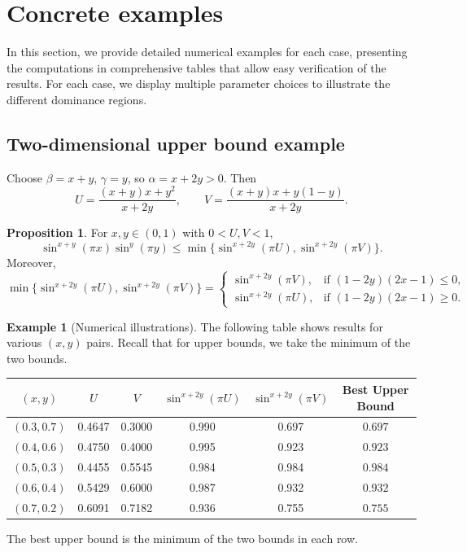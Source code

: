 \documentclass[12pt]{amsart}
\theoremstyle{definition}
\newtheorem{proposition}{Proposition}[section]
\newtheorem{example}{Example}[section]
\begin{document}

\section{Concrete examples}
\label{sec:examples}

In this section, we provide detailed numerical examples for each case, presenting the computations in comprehensive tables that allow easy verification of the results. For each case, we display multiple parameter choices to illustrate the different dominance regions.

\subsection{Two-dimensional upper bound example}

Choose $\beta = x + y$, $\gamma = y$, so $\alpha = x + 2y > 0$. Then
\[
U = \frac{(x+y)x + y^2}{x+2y}, \qquad V = \frac{(x+y)x + y(1-y)}{x+2y}.
\]

\begin{proposition}\label{prop:2d-upper-concrete}
For $x,y \in (0,1)$ with $0 < U,V < 1$,
\[
\sin^{x+y}(\pi x) \sin^y(\pi y) \leq \min\{\sin^{x+2y}(\pi U), \sin^{x+2y}(\pi V)\}.
\]
Moreover,
\[
\min\{\sin^{x+2y}(\pi U), \sin^{x+2y}(\pi V)\}
=
\begin{cases}
\sin^{x+2y}(\pi V), & \text{if } (1-2y)(2x-1) \leq 0,\\
\sin^{x+2y}(\pi U), & \text{if } (1-2y)(2x-1) \geq 0.
\end{cases}
\]
\end{proposition}

\begin{example}[Numerical illustrations]
The following table shows results for various $(x,y)$ pairs. Recall that for upper bounds, we take the minimum of the two bounds.

\begin{table}[h]
\centering
\begin{tabular}{|c|c|c|c|c|c|}
\hline
$(x,y)$ & $U$ & $V$ & $\sin^{x+2y}(\pi U)$ & $\sin^{x+2y}(\pi V)$ & Best Upper Bound \\
\hline
$(0.3,0.7)$ & 0.4647 & 0.3000 & 0.990 & 0.697 & $ 0.697$ \\
$(0.4,0.6)$ & 0.4750 & 0.4000 & 0.995 & 0.923 & $ 0.923$ \\
$(0.5,0.3)$ & 0.4455 & 0.5545 & 0.984 & 0.984 & $ 0.984$ \\
$(0.6,0.4)$ & 0.5429 & 0.6000 & 0.987 & 0.932 & $ 0.932$ \\
$(0.7,0.2)$ & 0.6091 & 0.7182 & 0.936 & 0.755 & $ 0.755$ \\
\hline
\end{tabular}
\end{table}
\noindent The best upper bound is the minimum of the two bounds in each row.
\end{example}
\end{document}
